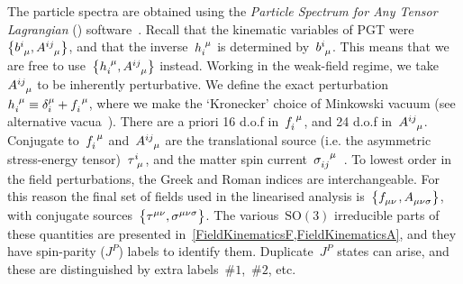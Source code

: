 \documentclass[aps,prd,reprint,preprintnumbers,showpacs,floatfix,nofootinbib,superscript address]{revtex4-2}
\begin{document}
The particle spectra are obtained using the \emph{Particle Spectrum for Any Tensor Lagrangian} (\PSALTer{}) software~\cite{Barker:2023bmr,Barker:2024ydb,Barker:2024dhb,Barker:2024juc}. Recall that the kinematic variables of PGT were~$\big\{\FieldB{^i_\mu},\FieldA{^{ij}_\mu}\big\}$, and that the inverse~$\FieldH{_i^\mu}$ is determined by~$\FieldB{^i_\mu}$. This means that we are free to use~$\big\{\FieldH{_i^\mu},\FieldA{^{ij}_\mu}\big\}$ instead. Working in the weak-field regime, we take~$\FieldA{^{ij}_\mu}$ to be inherently perturbative. We define the exact perturbation~$\FieldH{_i^\mu}\equiv\FieldDelta{_i^\mu}+\FieldPert{_i^\mu}$, where we make the `Kronecker' choice of Minkowski vacuum (see alternative vacua~\cite{Barker:2023bmr,Blixt:2022rpl,Blixt:2023qbg}). There are a priori 16 d.o.f in~$\FieldPert{_i^\mu}$, and 24 d.o.f in~$\FieldA{^{ij}_\mu}$. Conjugate to~$\FieldPert{_i^\mu}$ and~$\FieldA{^{ij}_\mu}$ are the translational source (i.e. the asymmetric stress-energy tensor)~$\FieldTau{^i_\mu}$, and the matter spin current~$\FieldSpin{_{ij}^\mu}$~\cite{Rigouzzo:2023sbb,Rigouzzo:2022yan,Karananas:2021zkl}. To lowest order in the field perturbations, the Greek and Roman indices are interchangeable. For this reason the final set of fields used in the linearised analysis is~$\big\{\FieldPert{_{\mu\nu}},\FieldA{_{\mu\nu\sigma}}\big\}$, with conjugate sources~$\big\{\FieldTau{^{\mu\nu}},\FieldSpin{^{\mu\nu\sigma}}\big\}$. The various~$\mathrm{SO}(3)$ irreducible parts of these quantities are presented in~\cref{FieldKinematicsF,FieldKinematicsA}, and they have spin-parity ($J^P$) labels to identify them. Duplicate~$J^P$ states can arise, and these are distinguished by extra labels~$\#1$,~$\#2$, etc.
\end{document}
